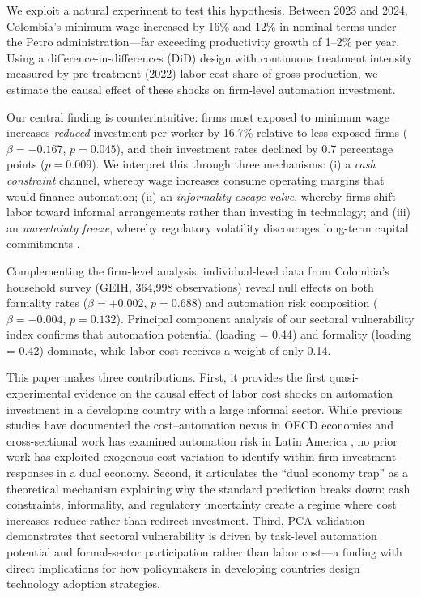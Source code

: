 \documentclass[a4paper,fleqn]{cas-sc}
\begin{document}
We exploit a natural experiment to test this hypothesis. Between 2023 and 2024, Colombia's minimum wage increased by 16\% and 12\% in nominal terms under the Petro administration---far exceeding productivity growth of 1--2\% per year. Using a difference-in-differences (DiD) design with continuous treatment intensity measured by pre-treatment (2022) labor cost share of gross production, we estimate the causal effect of these shocks on firm-level automation investment.

Our central finding is counterintuitive: firms most exposed to minimum wage increases \emph{reduced} investment per worker by 16.7\% relative to less exposed firms ($\beta = -0.167$, $p = 0.045$), and their investment rates declined by 0.7 percentage points ($p = 0.009$). We interpret this through three mechanisms: (i) a \emph{cash constraint} channel, whereby wage increases consume operating margins that would finance automation; (ii) an \emph{informality escape valve}, whereby firms shift labor toward informal arrangements rather than investing in technology; and (iii) an \emph{uncertainty freeze}, whereby regulatory volatility discourages long-term capital commitments \citep{prettner2020innovation}.

Complementing the firm-level analysis, individual-level data from Colombia's household survey (GEIH, 364,998 observations) reveal null effects on both formality rates ($\beta = +0.002$, $p = 0.688$) and automation risk composition ($\beta = -0.004$, $p = 0.132$). Principal component analysis of our sectoral vulnerability index confirms that automation potential (loading = 0.44) and formality (loading = 0.42) dominate, while labor cost receives a weight of only 0.14.

This paper makes three contributions. First, it provides the first quasi-experimental evidence on the causal effect of labor cost shocks on automation investment in a developing country with a large informal sector. While previous studies have documented the cost--automation nexus in OECD economies \citep{graetz2018, koch2021, adachi2022} and cross-sectional work has examined automation risk in Latin America \citep{bid2023, fedesarrollo2023, morales2023risk}, no prior work has exploited exogenous cost variation to identify within-firm investment responses in a dual economy. Second, it articulates the ``dual economy trap'' as a theoretical mechanism explaining why the standard prediction breaks down: cash constraints, informality, and regulatory uncertainty create a regime where cost increases reduce rather than redirect investment. Third, PCA validation demonstrates that sectoral vulnerability is driven by task-level automation potential and formal-sector participation rather than labor cost---a finding with direct implications for how policymakers in developing countries design technology adoption strategies.
\end{document}
